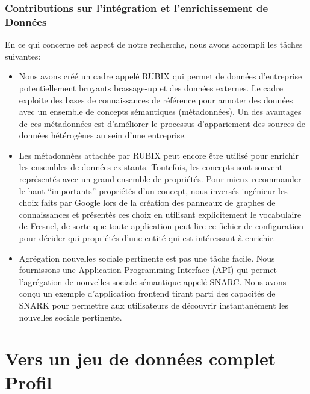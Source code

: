 \documentclass[a4paper,11pt,twoside]{ThesisStyle}
\begin{document}
\subsection{Contributions sur l'intégration et l'enrichissement de Données}

En ce qui concerne cet aspect de notre recherche, nous avons accompli les tâches suivantes:
\begin{itemize}
	\item Nous avons créé un cadre appelé RUBIX qui permet de données d'entreprise potentiellement bruyants brassage-up et des données externes. Le cadre exploite des bases de connaissances de référence pour annoter des données avec un ensemble de concepts sémantiques (métadonnées). Un des avantages de ces métadonnées est d'améliorer le processus d'appariement des sources de données hétérogènes au sein d'une entreprise.
	\item Les métadonnées attachée par RUBIX peut encore être utilisé pour enrichir les ensembles de données existants. Toutefois, les concepts sont souvent représentés avec un grand ensemble de propriétés. Pour mieux recommander le haut ``importants'' propriétés d'un concept, nous inversés ingénieur les choix faits par Google lors de la création des panneaux de graphes de connaissances et présentés ces choix en utilisant explicitement le vocabulaire de Fresnel, de sorte que toute application peut lire ce fichier de configuration pour décider qui propriétés d'une entité qui est intéressant à enrichir.
	\item Agrégation nouvelles sociale pertinente est pas une tâche facile. Nous fournissons une Application Programming Interface (API) qui permet l'agrégation de nouvelles sociale sémantique appelé SNARC. Nous avons conçu un exemple d'application frontend tirant parti des capacités de SNARK pour permettre aux utilisateurs de découvrir instantanément les nouvelles sociale pertinente.
\end{itemize}

\let\cleardoublepage\clearpage\let\cleardoublepage\clearpage
\chapter{Vers un jeu de données complet Profil}\label{chapter:1}

\end{document}
